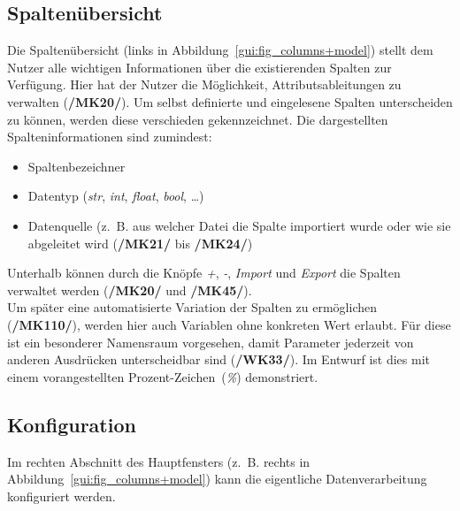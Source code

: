 \documentclass{article}
\begin{document}
\subsection{Spaltenübersicht}
Die Spaltenübersicht (links in Abbildung~\ref{gui:fig_columns+model}) stellt dem Nutzer alle wichtigen Informationen über die existierenden Spalten zur Verfügung. Hier hat der Nutzer die Möglichkeit, Attributsableitungen zu verwalten (\textbf{/MK20/}). Um selbst definierte und eingelesene Spalten unterscheiden zu können, werden diese verschieden gekennzeichnet. Die dargestellten Spalteninformationen sind zumindest:
\begin{itemize}
    \item Spaltenbezeichner
    \item Datentyp (\emph{str}, \emph{int}, \emph{float}, \emph{bool}, \dots)
    \item Datenquelle (z.~B. aus welcher Datei die Spalte importiert wurde oder wie sie abgeleitet wird (\textbf{/MK21/} bis \textbf{/MK24/})
\end{itemize}

Unterhalb können durch die Knöpfe \emph{+}, \emph{-}, \emph{Import} und \emph{Export} die Spalten verwaltet werden (\textbf{/MK20/} und \textbf{/MK45/}).\\

Um später eine automatisierte Variation der Spalten zu ermöglichen (\textbf{/MK110/}), werden hier auch Variablen ohne konkreten Wert erlaubt. Für diese ist ein besonderer Namensraum vorgesehen, damit Parameter jederzeit von anderen Ausdrücken unterscheidbar sind (\textbf{/WK33/}). Im Entwurf ist dies mit einem vorangestellten Prozent-Zeichen~(\emph{\%}) demonstriert.


\subsection{Konfiguration}
Im rechten Abschnitt des Hauptfensters (z.~B. rechts in Abbildung~\ref{gui:fig_columns+model}) kann die eigentliche Datenverarbeitung konfiguriert werden.
\end{document}
